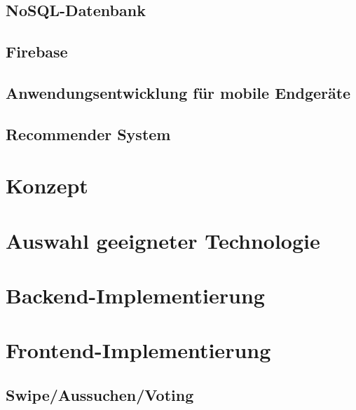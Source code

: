 \documentclass[11pt,a4paper]{article}
\begin{document}
\subsection{NoSQL-Datenbank}

\subsection{Firebase}

\subsection{Anwendungsentwicklung für mobile Endgeräte}

\subsection{Recommender System}

\clearpage

\section{Konzept}
\label{sec:konzept}

\clearpage


\section{Auswahl geeigneter Technologie}

\clearpage

\newpage
\section{Backend-Implementierung}


\newpage
\section{Frontend-Implementierung}
\subsection{Swipe/Aussuchen/Voting}		
\end{document}

